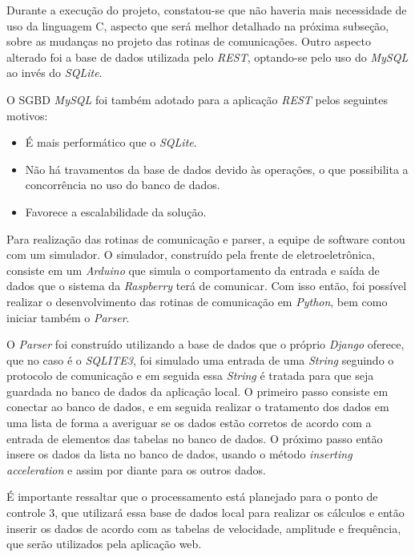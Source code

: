 Durante a execução do projeto, constatou-se que não haveria mais necessidade de uso da linguagem C, aspecto que será melhor detalhado na
próxima subseção, sobre as mudanças no projeto das rotinas de comunicações.
Outro aspecto alterado foi a base de dados utilizada pelo \textit{REST}, optando-se pelo uso do \textit{MySQL} ao invés do \textit{SQLite}.

O SGBD \textit{MySQL} foi também adotado para a aplicação \textit{REST} pelos seguintes motivos:

\begin{itemize}
  \item É mais performático que o \textit{SQLite}.
  \item Não há travamentos da base de dados devido às operações, o que possibilita a concorrência no uso do banco de dados.
  \item Favorece a escalabilidade da solução.
\end{itemize}

 \label{software:rotinas}

Para realização das rotinas de comunicação e parser, a equipe de software contou com um simulador. O simulador, construído pela frente de eletroeletrônica, 
consiste em um \textit{Arduino} que simula o comportamento da entrada e saída de dados que o sistema da \textit{Raspberry} terá de comunicar. Com isso 
então, foi possível realizar o desenvolvimento das rotinas de comunicação em \textit{Python}, bem como iniciar também o \textit{Parser}.

O \textit{Parser} foi construído utilizando a base de dados que o próprio \textit{Django} oferece, que no caso é o \textit{SQLITE3}, foi simulado uma 
entrada de uma \textit{String} seguindo o protocolo de comunicação e em seguida essa \textit{String} é tratada para que seja guardada no banco de dados 
da aplicação local. O primeiro passo consiste em conectar ao banco de dados, e em seguida realizar o tratamento dos dados em uma lista de forma a 
averiguar se os dados estão corretos de acordo com a entrada de elementos das tabelas no banco de dados. O próximo passo então insere os dados da lista 
no banco de dados, usando o método \textit{inserting acceleration} e assim por diante para os outros dados.

É importante ressaltar que o processamento está planejado para o ponto de controle 3, que utilizará essa base de dados local para realizar os cálculos 
e então inserir os dados de acordo com as tabelas de velocidade, amplitude e frequência, que serão utilizados pela aplicação web.


